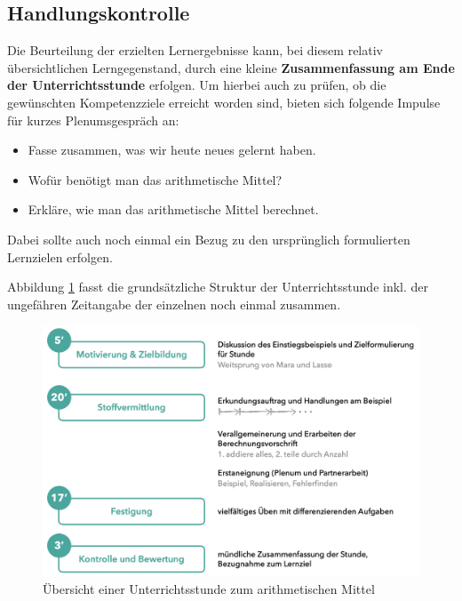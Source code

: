 \documentclass[
]{scrbook}
\providecommand{\tightlist}{%
  \setlength{\itemsep}{0pt}\setlength{\parskip}{0pt}}
\theoremstyle{definition}
\theoremstyle{definition}
\theoremstyle{definition}
\theoremstyle{definition}
\theoremstyle{remark}
\begin{document}
\subsection{Handlungskontrolle}\label{handlungskontrolle-1}

Die Beurteilung der erzielten Lernergebnisse kann, bei diesem relativ übersichtlichen Lerngegenstand, durch eine kleine \textbf{Zusammenfassung am Ende der Unterrichtsstunde} erfolgen. Um hierbei auch zu prüfen, ob die gewünschten Kompetenzziele erreicht worden sind, bieten sich folgende Impulse für kurzes Plenumsgespräch an:

\begin{itemize}
\tightlist
\item
  Fasse zusammen, was wir heute neues gelernt haben.\\
\item
  Wofür benötigt man das arithmetische Mittel?
\item
  Erkläre, wie man das arithmetische Mittel berechnet.
\end{itemize}

Dabei sollte auch noch einmal ein Bezug zu den ursprünglich formulierten Lernzielen erfolgen.

Abbildung \ref{fig:Uebersicht} fasst die grundsätzliche Struktur der Unterrichtsstunde inkl. der ungefähren Zeitangabe der einzelnen noch einmal zusammen.

\begin{figure}

{\centering \includegraphics[width=0.9\linewidth]{pictures/B-Uebersicht} 

}

\caption{Übersicht einer Unterrichtsstunde zum arithmetischen Mittel}\label{fig:Uebersicht}
\end{figure}
\end{document}
